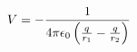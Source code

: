 \documentclass[preview]{standalone}
\begin{document}
\begin{align*}
V  =  - {1 \over {4 \pi\epsilon_0}  \left( \frac{q}{r_1} - \frac{q}{r_2} \right)}
\end{align*}
\end{document}
